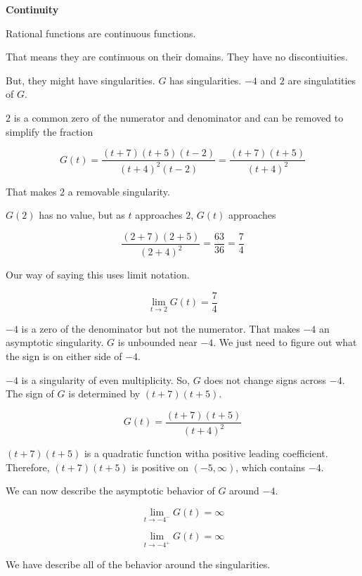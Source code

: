 \documentclass{ximera}
\begin{document}
\textbf{\textcolor{purple!85!blue}{Continuity}} 

\begin{explanation}

Rational functions are continuous functions.

That means they are continuous on their domains. They have no discontiuities.

But, they might have singularities.  $G$ has singularities. $-4$ and $2$ are singulatities of $G$.


$2$ is a common zero of the numerator and denominator and can be removed to simplify the fraction


\[
G(t) = \frac{(t+7)(t+5)(t-2)}{(t+4)^2(t-2)} = \frac{(t+7)(t+5)}{(t+4)^2}
\]

That makes $2$ a removable singularity.


$G(2)$ has no value, but as $t$ approaches $2$, $G(t)$ approaches 


\[
\frac{(2+7)(2+5)}{(2+4)^2} = \frac{63}{36} = \frac{7}{4}
\]



Our way of saying this uses limit notation.



\[
\lim\limits_{t \to 2} G(t) = \frac{7}{4}
\]




$-4$ is a zero of the denominator but not the numerator.  That makes $-4$ an asymptotic singularity.  $G$ is unbounded near $-4$.  We just need to figure out what the sign is on either side of $-4$.


$-4$ is a singularity of even multiplicity.  So, $G$ does not change signs across $-4$.  The sign of $G$ is determined by $(t+7)(t+5)$.

\[
G(t) = \frac{(t+7)(t+5)}{(t+4)^2}
\]


$(t+7)(t+5)$ is a quadratic function witha positive leading coefficient. Therefore, $(t+7)(t+5)$ is positive on $(-5, \infty)$, which contains $-4$.

We can now describe the asymptotic behavior of $G$ around $-4$.


\[
\lim\limits_{t \to -4^-} G(t) = \infty
\]


\[
\lim\limits_{t \to -4^+} G(t) = \infty
\]

\end{explanation}



We have describe all of the behavior around the singularities. 
\end{document}
